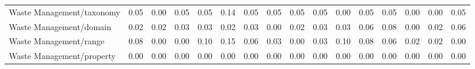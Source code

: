 \begin{tabular}{lccccccccccccccc}
Waste Management/taxonomy & 0.05 & 0.00 & 0.05 & 0.05 & 0.14 & 0.05 & 0.05 & 0.05 & 0.05 & 0.00 & 0.05 & 0.05 & 0.00 & 0.00 & 0.05 \\
Waste Management/domain & 0.02 & 0.02 & 0.03 & 0.03 & 0.02 & 0.03 & 0.00 & 0.02 & 0.03 & 0.03 & 0.06 & 0.08 & 0.00 & 0.02 & 0.06 \\
Waste Management/range & 0.08 & 0.00 & 0.00 & 0.10 & 0.15 & 0.06 & 0.03 & 0.00 & 0.03 & 0.10 & 0.08 & 0.06 & 0.02 & 0.02 & 0.00 \\
Waste Management/property & 0.00 & 0.00 & 0.00 & 0.00 & 0.00 & 0.00 & 0.00 & 0.00 & 0.00 & 0.00 & 0.00 & 0.00 & 0.00 & 0.00 & 0.00 \\
\bottomrule
\end{tabular}
